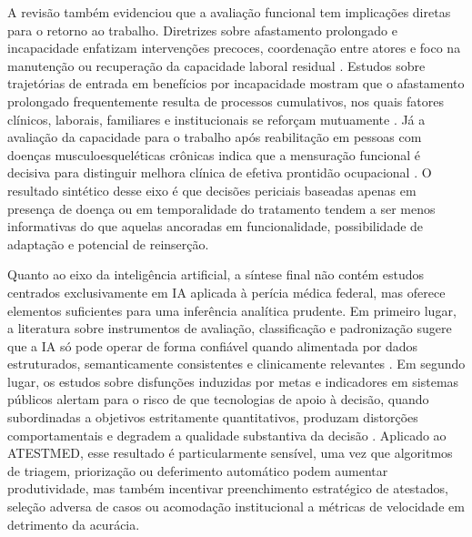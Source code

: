 \documentclass[12pt,a4paper]{article}
\begin{document}
A revisão também evidenciou que a avaliação funcional tem implicações diretas para o retorno ao trabalho. Diretrizes sobre afastamento prolongado e incapacidade enfatizam intervenções precoces, coordenação entre atores e foco na manutenção ou recuperação da capacidade laboral residual \parencite{gabbay2011niceguidanceonlongtermsicknessandincapacity}. Estudos sobre trajetórias de entrada em benefícios por incapacidade mostram que o afastamento prolongado frequentemente resulta de processos cumulativos, nos quais fatores clínicos, laborais, familiares e institucionais se reforçam mutuamente \parencite{sainsbury2006routesontoincapacitybenefitsfindingsfromqualitati, corden2001incapacitybenefitsandworkincentives}. Já a avaliação da capacidade para o trabalho após reabilitação em pessoas com doenças musculoesqueléticas crônicas indica que a mensuração funcional é decisiva para distinguir melhora clínica de efetiva prontidão ocupacional \parencite{przysada2019anassessmentofworkabilityafterthecompletionofre}. O resultado sintético desse eixo é que decisões periciais baseadas apenas em presença de doença ou em temporalidade do tratamento tendem a ser menos informativas do que aquelas ancoradas em funcionalidade, possibilidade de adaptação e potencial de reinserção.

Quanto ao eixo da inteligência artificial, a síntese final não contém estudos centrados exclusivamente em IA aplicada à perícia médica federal, mas oferece elementos suficientes para uma inferência analítica prudente. Em primeiro lugar, a literatura sobre instrumentos de avaliação, classificação e padronização sugere que a IA só pode operar de forma confiável quando alimentada por dados estruturados, semanticamente consistentes e clinicamente relevantes \parencite{steenbeek2011thedevelopmentofinstrumentstomeasuretheworkdisa, feudtner2014pediatriccomplexchronicconditionsclassificationsyst}. Em segundo lugar, os estudos sobre disfunções induzidas por metas e indicadores em sistemas públicos alertam para o risco de que tecnologias de apoio à decisão, quando subordinadas a objetivos estritamente quantitativos, produzam distorções comportamentais e degradem a qualidade substantiva da decisão \parencite{kelman2009performanceimprovementandperformancedysfunctionanemp}. Aplicado ao ATESTMED, esse resultado é particularmente sensível, uma vez que algoritmos de triagem, priorização ou deferimento automático podem aumentar produtividade, mas também incentivar preenchimento estratégico de atestados, seleção adversa de casos ou acomodação institucional a métricas de velocidade em detrimento da acurácia.
\end{document}
